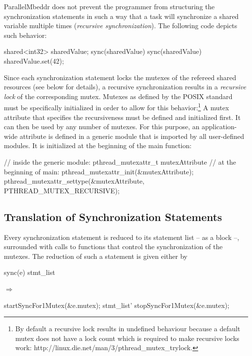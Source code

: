 ParallelMbeddr does not prevent the programmer from structuring the synchronization statements in such a way that a task will synchronize a shared variable multiple times (\textit{recursive synchronization}). The following code depicts such behavior:
\begin{ccode}
shared<int32> sharedValue;
sync(sharedValue) {
  sync(sharedValue) {
    sharedValue.set(42);
  }
}
\end{ccode}
Since each synchronization statement locks the mutexes of the refereed shared resources (see below for details), a recursive synchronization results in a \textit{recursive lock} of the corresponding mutex. Mutexes as defined by the POSIX standard must be specifically initialized in order to allow for this behavior:\footnote{By default a recursive lock results in undefined behaviour because a default mutex does not have a lock count which is required to make recursive locks work: http://linux.die.net/man/3/pthread\_mutex\_trylock.} A mutex attribute that specifies the recursiveness must be defined and initialized first. It can then be used by any number of mutexes. For this purpose, an application-wide attribute is defined in a generic module that is imported by all user-defined modules. It is initialized at the beginning of the main function:
\begin{ccode}
// inside the generic module:
pthread_mutexattr_t mutexAttribute
// at the beginning of main:
pthread_mutexattr_init(&mutexAttribute);
pthread_mutexattr_settype(&mutexAttribute, PTHREAD_MUTEX_RECURSIVE);
\end{ccode}

\subsection{Translation of Synchronization Statements}
Every synchronization statement is reduced to its statement list -- as a block --, surrounded with calls to functions that control the synchronization of the mutexes. The reduction of such a statement is given either by

\begin{center}
\begin{minipage}{0.3\textwidth}
\begin{ccode}
sync(e) stmt_list
\end{ccode}
\end{minipage}
\qquad$\Longrightarrow$\qquad\qquad\qquad
\begin{minipage}{0.4\textwidth}
\begin{ccode}
startSyncFor1Mutex(&e.mutex);
stmt_list'
stopSyncFor1Mutex(&e.mutex);
\end{ccode}
\end{minipage}
\end{center}

